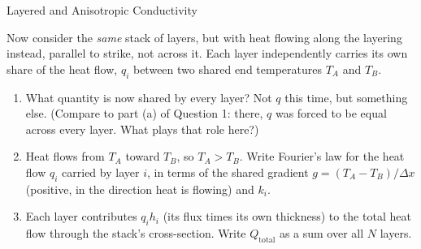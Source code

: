 \begin{activity}{Layered and Anisotropic Conductivity}
\begin{questions}

    Now consider the \emph{same} stack of layers, but with heat flowing along the layering instead, parallel to strike, not across it. Each layer independently carries its own share of the heat flow, $q_i$ between two shared end temperatures $T_A$ and $T_B$.

    \begin{center}
    \end{center}

    \begin{enumerate}[label=(\alph*)]
        \item What quantity is now shared by every layer? Not $q$ this time, but something else. (Compare to part (a) of Question 1: there, $q$ was forced to be equal across every layer. What plays that role here?)
        \answerbox[1.5cm]

        \item Heat flows from $T_A$ toward $T_B$, so $T_A > T_B$. Write Fourier's law for the heat flow $q_i$ carried by layer $i$, in terms of the shared gradient $g = (T_A-T_B)/\Delta x$ (positive, in the direction heat is flowing) and $k_i$.
        \answerbox[1.5cm]

        \item Each layer contributes $q_i h_i$ (its flux times its own thickness) to the total heat flow through the stack's cross-section. Write $Q_\text{total}$ as a sum over all $N$ layers.
        \answerbox[2cm]


\end{enumerate}
\end{questions}
\end{activity}
